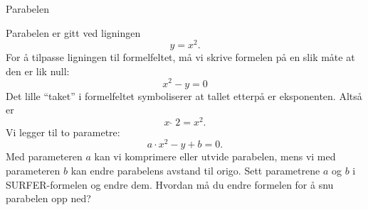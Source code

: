 \documentclass[no]{./../../common/SurferDesc}%
\begin{document}
\footnotesize
%
\begin{surferPage}
  \begin{surferTitle}Parabelen\end{surferTitle}
   \begin{surferText}
   
Parabelen er gitt ved ligningen \[y=x^2.\]
For å tilpasse ligningen til formelfeltet, må vi skrive formelen på en slik måte at den er lik null:
\[x^2-y=0\]
Det lille \enquote{taket} i formelfeltet symboliserer at tallet etterpå er eksponenten. Altså er
\[ x  \,\hat{\ } \, 2 =x^2.\]
Vi legger til to parametre:
\[a \cdot x^2-y+b=0.\]
Med parameteren $a$ kan vi komprimere eller utvide parabelen, mens vi med parameteren $b$ kan endre parabelens avstand til origo. 
\newline
Sett parametrene $a$ og $b$ i SURFER-formelen og endre dem. Hvordan må du endre formelen for å snu parabelen opp ned?
\end{surferText}
\end{surferPage}
\end{document}
